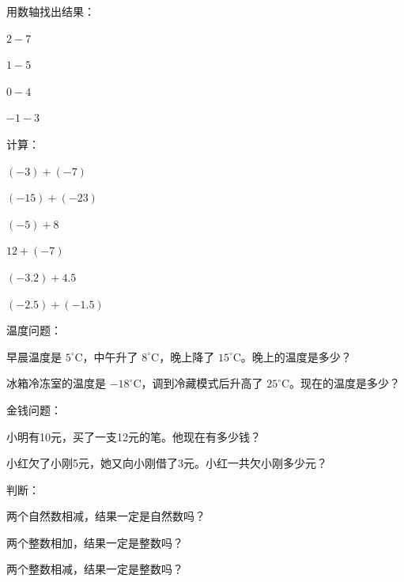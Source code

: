 \begin{exercise}
\item 用数轴找出结果：
  \begin{subexercise}
    \item $2-7$
    \item $1-5$
    \item $0-4$
    \item $-1-3$
  \end{subexercise}

\item 计算：
  \begin{subexercise}
    \item $(-3)+(-7)$
    \item $(-15)+(-23)$
    \item $(-5)+8$
    \item $12+(-7)$
    \item $(-3.2)+4.5$
    \item $(-2.5)+(-1.5)$
  \end{subexercise}

\item 温度问题：
  \begin{subexercise}
    \item 早晨温度是 $5^\circ$C，中午升了 $8^\circ$C，晚上降了 $15^\circ$C。晚上的温度是多少？
    \item 冰箱冷冻室的温度是 $-18^\circ$C，调到冷藏模式后升高了 $25^\circ$C。现在的温度是多少？
  \end{subexercise}

\item 金钱问题：
  \begin{subexercise}
    \item 小明有10元，买了一支12元的笔。他现在有多少钱？
    \item 小红欠了小刚5元，她又向小刚借了3元。小红一共欠小刚多少元？
  \end{subexercise}

\item 判断：
  \begin{subexercise}
    \item 两个自然数相减，结果一定是自然数吗？
    \item 两个整数相加，结果一定是整数吗？
    \item 两个整数相减，结果一定是整数吗？
  \end{subexercise}
\end{exercise}


